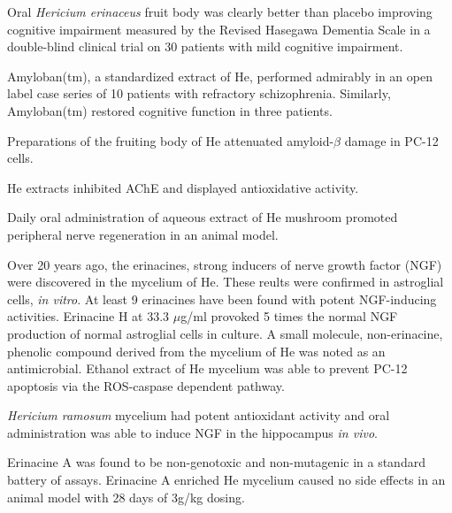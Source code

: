 Oral \textit{Hericium erinaceus} fruit body
was clearly better than placebo
improving cognitive impairment
measured by the Revised Hasegawa Dementia Scale
in a double-blind clinical trial on 30 patients
with mild cognitive impairment.
\cite{mori2009improving}

Amyloban(tm), a standardized extract of He,
performed admirably in an open label case series
of 10 patients with refractory schizophrenia.
\cite{inanaga2014improvement}
Similarly, Amyloban(tm) restored cognitive function
in three patients.
\cite{inanaga2015treatment}

Preparations of the fruiting body of He
attenuated amyloid-$\beta$ damage in PC-12 cells.
\cite{liu2015systemic}


He extracts inhibited AChE and displayed antioxidative activity.
\cite{jung2007ache}



Daily oral administration of
aqueous extract of He mushroom
promoted peripheral nerve regeneration
in an animal model.
\cite{wong2011peripheral,
wong2014hericium}


Over 20 years ago, the erinacines,
strong inducers of nerve growth factor (NGF) were discovered
in the mycelium of He.
\cite{kawagishi1994erinacines}
These reults were confirmed in astroglial cells, \textit{in vitro}.
\cite{
kawagishi1996erinacines,
kawagishi1996erinacine}
At least 9 erinacines have been found with potent NGF-inducing
activities. Erinacine H at 33.3 $\mu$g/ml provoked 5 times
the normal NGF production of normal astroglial cells in culture.
\cite{
lee2000two,
kawagishi2006erinacines}
A small molecule, non-erinacine, phenolic compound derived from
the mycelium of He was noted as an antimicrobial.
\cite{okamoto1993antimicrobial}
Ethanol extract of He mycelium was able to
prevent PC-12 apoptosis via the ROS-caspase dependent pathway.
\cite{chang2016improvement}

\textit{Hericium ramosum} mycelium had potent antioxidant activity
and oral administration was able to
induce NGF in the hippocampus \textit{in vivo}.
\cite{suruga2015effects}

Erinacine A was found to be non-genotoxic and
non-mutagenic in a standard battery of assays.
\cite{li2014genotoxicity}
Erinacine A enriched He mycelium caused no side effects
in an animal model with 28 days of 3g/kg dosing.
\cite{li2014evaluation}








